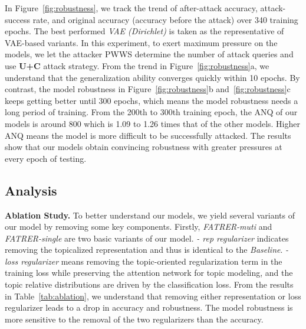 \documentclass{ecai}
\begin{document}
In Figure~\ref{fig:robustness}, we track the trend of after-attack accuracy, attack-success rate, and original accuracy (accuracy before the attack) over 340 training epochs. The best performed \textit{VAE (Dirichlet)} is taken as the representative of VAE-based variants. In this experiment, to exert maximum pressure on the models, we let the attacker PWWS determine the number of attack queries and use \textbf{U+C} attack strategy. From the trend in Figure~\ref{fig:robustness}a, we understand that the generalization ability converges quickly within 10 epochs. By contrast, the model robustness in Figure~\ref{fig:robustness}b and~\ref{fig:robustness}c keeps getting better until 300 epochs, which means the model robustness needs a long period of training. From the 200th to 300th training epoch, the ANQ of our models is around 800 which is 1.09 to 1.26 times that of the other models. Higher ANQ means the model is more difficult to be successfully attacked. The results show that our models obtain convincing robustness with greater pressures at every epoch of testing.

\subsection{Analysis}

\textbf{Ablation Study.}  To better understand our models, we yield several variants of our model by removing some key components. Firstly, \textit{FATRER-muti} and \textit{FATRER-single} are two basic variants of our model. \textit{- rep regularizer} indicates removing the topicalized representation and thus is identical to the \textit{Baseline}. \textit{- loss regularizer} means removing the topic-oriented regularization term in the training loss while preserving the attention network for topic modeling, and the topic relative distributions are driven by the classification loss. From the results in Table~\ref{tab:ablation}, we understand that removing either representation or loss regularizer leads to a drop in accuracy and robustness. The model robustness is more sensitive to the removal of the two regularizers than the accuracy.
\end{document}
